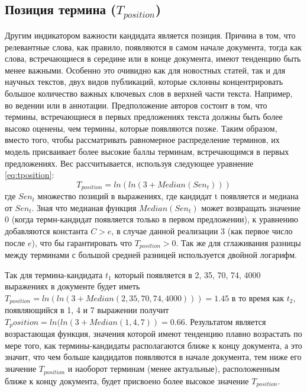 \subsection{Позиция термина ($T_{position}$)}
Другим индикатором важности кандидата является позиция.
Причина в том, что релевантные слова, как правило, появляются в самом начале документа, тогда как слова, встречающиеся в середине или в конце документа, имеют тенденцию быть менее важными.
Особенно это очивидно как для новостных статей, так и для научных текстов, двух видов публикаций, которые склонны концентрировать большое количество важных ключевых слов в верхней части текста.
Например, во ведении или в аннотации.
Предположение авторов состоит в том, что термины, встречающиеся в первых предложениях текста должны быть более высоко оценены, чем термины, которые появляются позже. 
Таким образом, вместо того, чтобы рассматривать равномерное распределение терминов,
их модель присваивает более высокие баллы терминам, встречающимся в первых предложениях. 
Вес рассчитывается, используя следующее уравнение \eqref{eq:tposition}:
\begin{equation}
	\label{eq:tposition}
	T_{position} = ln(ln(3 + Median(Sen_t)))
\end{equation}
где $Sen_t$ множество позиций в выражениях, где кандидат t появляется и медиана от $Sen_t$.
Зная что медианая функция $Median(Sen_t)$ может возвращать значение 0 (когда термн-кандидат появляется только в первом предложении), к уравнению добавляются константа $C > e$, в случае данной реализации 3 (как первое число после $e$), что бы гарантировать что $T_{position} > 0$.
Так же для сглаживания разницы между терминами с большой средней разницей используется двойной логарифм.

Так для термина-кандидата $t_1$ который появляется в 2, 35, 70, 74, 4000 выражениях в документе будет иметь $T_{position} = ln(ln(3 + Median(2, 35, 70, 74, 4000))) = 1.45$ в то время как $t_2$, появляющийся в 1, 4 и 7 выражении получит $T_position = ln(ln(3 + Median(1, 4, 7)) = 0.66$.
Результатом является возрастающая функция, значения которой имеют тенденцию плавно возрастать по мере того, как термины-кандидаты располагаются ближе к концу документа, а это значит, что чем больше кандидатов появляются в начале документа, тем ниже его значение $T_{position}$ и наоборот терминам (менее актуальные), расположенным ближе к концу документа, будет присвоено более высокое значение $T_{position}$.

